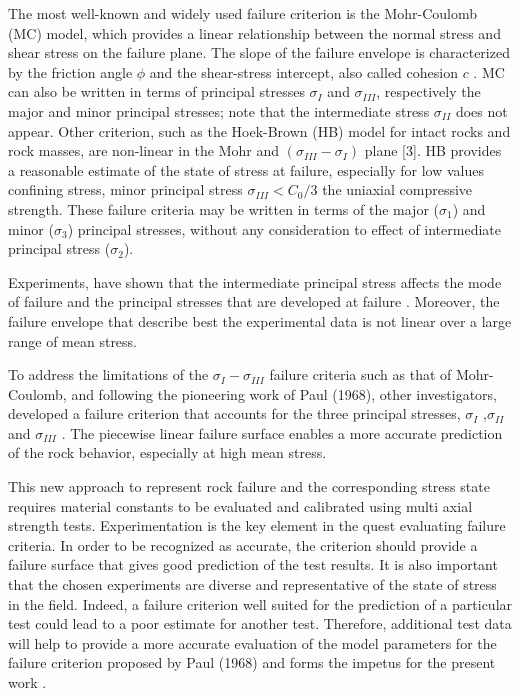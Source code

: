 The most well-known and widely used failure criterion is the Mohr-Coulomb (MC) model, which provides a linear relationship between the normal stress and shear stress on the failure plane. The slope of the failure envelope is characterized by the friction angle $\phi$ and the shear-stress intercept, also called cohesion $c$ \cite{Jaeger1979}. MC can also be written in terms of principal stresses $\sigma_I$ and $\sigma_{III}$, respectively the major and minor principal stresses; note that the intermediate stress $\sigma_{II}$ does not appear. Other criterion, such as the Hoek-Brown (HB) model for intact rocks and rock masses, are non-linear in the Mohr and $(\sigma_{III}-\sigma_{I})$ plane [3]. HB provides a reasonable estimate of the state of stress at failure, especially for low values confining stress, minor principal stress $\sigma_{III} < C_0/3$ the uniaxial compressive strength. These failure criteria may be written in terms of the major ($\sigma_1$) and minor ($\sigma_3$) principal stresses, without any consideration to effect of intermediate principal stress ($\sigma_2$).

Experiments, have shown that the intermediate principal stress affects the mode of failure and the principal stresses that are developed at failure \cite{Labuz2018,Labuz1996, Zeng2019,Makhnenko2013}. Moreover, the failure envelope that describe best the experimental data is not linear over a large range of mean stress. 

To address the limitations of the $\sigma_I-\sigma_{III}$ failure criteria such as that of Mohr-Coulomb, and following the pioneering work of Paul (1968), other investigators, developed a failure criterion that accounts for the three principal stresses, $\sigma_I$ ,$\sigma_{II}$ and $\sigma_{III}$ \cite{Paul1968,Meyer2013}. The piecewise linear failure surface enables a more accurate prediction of the rock behavior, especially at high mean stress. 

This new approach to represent rock failure and the corresponding stress state requires material constants to be evaluated and calibrated using multi axial strength tests. Experimentation is the key element in the quest evaluating failure criteria. In order to be recognized as accurate, the criterion should provide a failure surface that gives good prediction of the test results. It is also important that the chosen experiments are diverse and representative of the state of stress in the field. Indeed, a failure criterion well suited for the prediction of a particular test could lead to a poor estimate for another test. Therefore, additional test data will help to provide a more accurate evaluation of the model parameters for the failure criterion proposed by Paul (1968) and forms the impetus for the present work \cite{Paul1968}.

